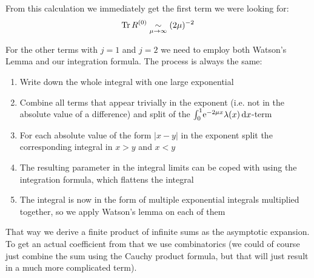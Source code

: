 From this calculation we immediately get the first term we were looking for:
\begin{align}
  \label{eqn:tr1}
  \Tr R^{(0)} \SimAs{\mu\to\infty} (2\mu)^{-2}
\end{align}

For the other terms with $j=1$ and $j=2$ we need to employ both Watson's Lemma
and our integration formula. The process is always the same:
\begin{enumerate}
  \item Write down the whole integral with one large exponential
  \item Combine all terms that appear trivially in the exponent (i.e. not in the
    absolute value of a difference) and split of the $\Int{x}{\Eto{-2\mu
    x}\lambda(x)}$-term
  \item For each absolute value of the form $\left|x-y\right|$ in the exponent 
    split the corresponding integral in $x > y$ and $x < y$
  \item The resulting parameter in the integral limits can be coped with using
    the integration formula, which flattens the integral
  \item The integral is now in the form of multiple exponential integrals
    multiplied together, so we apply Watson's lemma on each of them
\end{enumerate}
That way we derive a finite product of infinite sums as the asymptotic
expansion. To get an actual coefficient from that we use combinatorics (we could
of course just combine the sum using the Cauchy product formula, but that will
just result in a much more complicated term).

